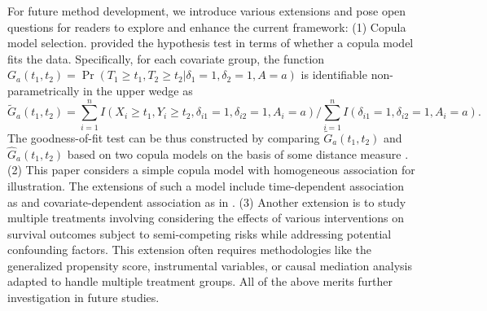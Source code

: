 \documentclass[APA,Times1COL]{WileyNJDv5} %
\theoremstyle{plain}
\def\Pr{\operatorname{Pr}}
\begin{document}
For future method development, we introduce various extensions and pose open questions for readers to explore and enhance the current framework:  (1) Copula model selection. \cite{hsieh2008} provided the hypothesis test in terms of whether a copula model fits the data. Specifically, for each covariate group, the function $G_a(t_1,t_2) = \Pr(T_1\geq t_1, T_2\geq t_2|\delta_1 = 1,\delta_2 = 1, A=a)$ is identifiable non-parametrically in the upper wedge as
$$\widetilde{G}_a (t_1,t_2)= \sum\limits_{i=1}^n I(X_i\geq t_1, Y_i\geq t_2,\delta_{i1}=1,\delta_{i2}=1,A_i=a)/\sum\limits_{i=1}^n I(\delta_{i1}=1,\delta_{i2}=1,A_i=a).$$
% 
The goodness-of-fit test can be thus constructed by comparing $\widetilde{G}_a(t_1,t_2)$ and $\widehat{G}_a(t_1,t_2)$ based on two copula models on the basis of some distance measure \citep{hsieh2008}. (2) This paper considers a simple copula model with homogeneous association for illustration.  The extensions of such a model include time-dependent association as \cite{peng2007semicompeting} and covariate-dependent association as in \cite{li2015}. (3) Another extension is to study multiple treatments
involving considering the effects of various interventions on survival outcomes subject to semi-competing risks while addressing potential confounding factors. This extension often requires methodologies like the generalized propensity score, instrumental variables, or causal mediation analysis adapted to handle multiple treatment groups. 
All of the above merits further investigation in future studies.









\end{document}

